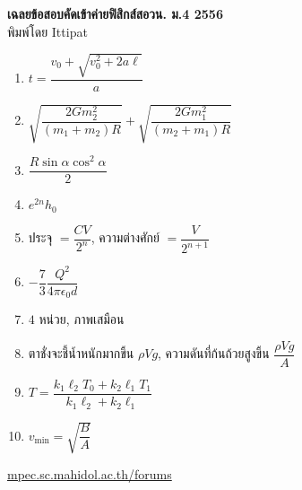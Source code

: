 \documentclass[a4paper,12pt]{article}
\begin{document}
\thispagestyle{empty}
\begin{center}
	{\huge \textbf{เฉลยข้อสอบคัดเข้าค่ายฟิสิกส์สอวน. ม.\textenglish{4} 2556}}\\
	พิมพ์โดย Ittipat\\
\end{center}
\begin{enumerate}
	\item \(t = \dfrac{v_{0}+\sqrt{v_{0}^2 +2 a\ell}}{a}\)
	\item \(\sqrt{\dfrac{2Gm_{2}^{2}}{(m_{1}+m_{2})R}} + \sqrt{\dfrac{2Gm_{1}^{2}}{(m_{2}+m_{1})R}}\)
	\item \(\dfrac{R \sin \alpha \cos ^2 \alpha}{2}\)
	\item \(e^{2n}h_{0}\)
	\item ประจุ \(=\dfrac{CV}{2^n}\), ความต่างศักย์ \(=\dfrac{V}{2^{n+1}}\)
	\item \(-\dfrac{7}{3} \dfrac{Q^{2}}{4\pi \epsilon _{0}d}\)
	\item \(4\) หน่วย, ภาพเสมือน
	\item ตาชั่งจะชี้น้ำหนักมากขึ้น \(\rho Vg\), ความดันที่ก้นถ้วยสูงขึ้น \(\dfrac{\rho Vg}{A}\)
	\item \(T = \dfrac{k_{1}\ell_{2}T_{0}+k_{2}\ell_{1}T_{1}}{k_{1}\ell_{2}+k_{2}\ell_{1}}\)
	\item\(v_{\text{min}}=\sqrt{\dfrac{B}{A}}\)
\end{enumerate}
\vfill	
\begin{center}
	\href{http://mpec.sc.mahidol.ac.th/forums/}{mpec.sc.mahidol.ac.th/forums}
\end{center}
\end{document}
